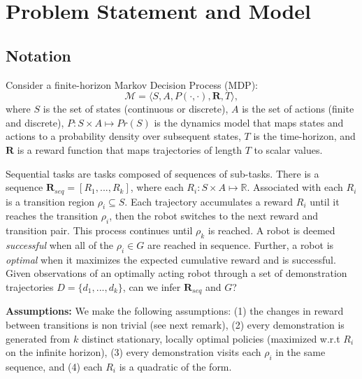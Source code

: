 \section{Problem Statement and Model}

\subsection{Notation}
Consider a finite-horizon Markov Decision Process (MDP): \[\mathcal{M} = \langle S,A,P(\cdot,\cdot),\mathbf{R},T \rangle,\] where $S$ is the set of states (continuous or discrete), $A$ is the set of actions (finite and discrete), $P: S \times A \mapsto Pr(S)$ is the dynamics model that maps states and actions to a probability density over subsequent states, $T$ is the time-horizon, and $\mathbf{R}$ is a reward function that maps trajectories of length $T$ to scalar values.

Sequential tasks are tasks composed of sequences of sub-tasks. There is a sequence $\mathbf{R}_{seq}=[R_1,...,R_k]$, where each $R_i: S \times A \mapsto \mathbb{R}$. Associated with each $R_i$ is a transition region $\rho_i \subseteq S$. 
Each trajectory accumulates a reward $R_i$ until it reaches the transition $\rho_i$, then the robot switches to the next reward and transition pair.
This process continues until $\rho_k$ is reached.
A robot is deemed \emph{successful} when all of the $\rho_i \in G$ are reached in sequence.
Further, a robot is \emph{optimal} when it maximizes the expected cumulative reward and is successful.
Given observations of an optimally acting robot through a set of demonstration trajectories $D = \{d_1,...,d_k\}$, can we infer $\mathbf{R}_{seq}$ and $G$?

\vspace{0.5em}\noindent\textbf{Assumptions: } We make the following assumptions: (1) the changes in reward between transitions is non trivial (see next remark), (2) every demonstration is generated from $k$ distinct stationary, locally optimal policies (maximized w.r.t  $R_i$ on the infinite horizon), (3) every demonstration visits each $\rho_i$ in the same sequence, and (4) each $R_i$ is a quadratic of the form.
\vspace{0.5em}

